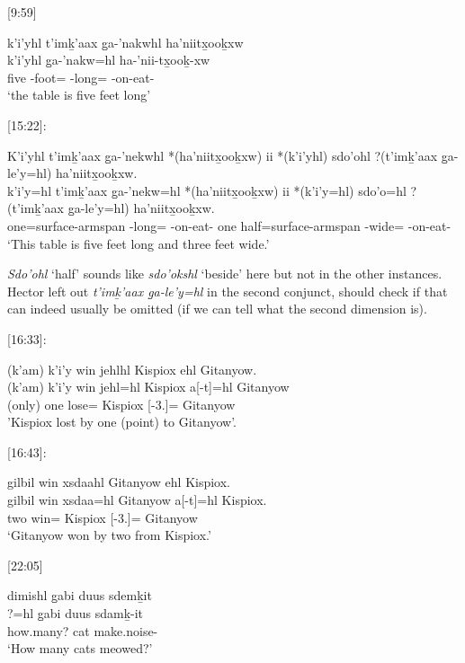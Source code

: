 [9:59] \begin{exe}
    \ex \glll
    k'i'yhl t’imḵ’aax g̱a-’nakwhl ha’niitx̱ooḵxw \\
    k'i'yhl g̱a-’nakw=hl ha-’nii-tx̱ooḵ-xw \\
    five \Pl-foot=\Cn{} \Dist-long=\Cn{} \Ins-on-eat-\Val{} \\
    \glt `the table is five feet long'
\end{exe}

[15:22]:
\begin{exe}
    \ex \glll
    K’i’yhl t’imḵ’aax g̱a-’nekwhl *(ha’niitx̱ooḵxw) ii *(k’i’yhl) sdo’ohl ?(t’imḵ’aax g̱a-le’y=hl) ha’niitx̱ooḵxw. \\
    k’i’y=hl t’imḵ’aax g̱a-’nekw=hl *(ha’niitx̱ooḵxw) ii *(k’i’y=hl) sdo’o=hl ?(t’imḵ’aax g̱a-le’y=hl) ha’niitx̱ooḵxw. \\
    one=\Cn{}surface-armspan \Dist-long=\Cn{} \Ins-on-eat-\Val{} one half=\Cn{}surface-armspan \Dist-wide=\Cn{} \Ins-on-eat-\Val{} \\
    \glt `This table is five feet long and three feet wide.'
\end{exe}

\textit{Sdo’ohl} `half'  sounds like \textit{sdo’okshl} `beside' here but not in the other instances. Hector left out \textit{t’imḵ’aax g̱a-le’y=hl} in the second conjunct, should check if that can indeed usually be omitted (if we can tell what the second dimension is). 

[16:33]:
\begin{exe}
    \ex \glll 
    (k’am) k'i'y win jehlhl Kispiox ehl Gitanyow. \\	
    (k’am) k'i'y win jehl=hl Kispiox a[-t]=hl Gitanyow \\
    (only) one \Comp{} lose=\Cn{} Kispiox \Prep{}[-3.\Ii]=\Cn{} Gitanyow \\
    \glt 'Kispiox lost by one (point) to Gitanyow'.
\end{exe}


[16:43]:
\begin{exe}
    \ex \glll 
    gilbil win xsdaahl Gitanyow ehl Kispiox. \\
    gilbil win xsdaa=hl Gitanyow a[-t]=hl Kispiox. \\
    two \Comp win=\Cn{} Kispiox \Prep{}[-3.\Ii]=\Cn{} Gitanyow \\
    \glt `Gitanyow won by two from Kispiox.'
\end{exe}

[22:05]
\begin{exe}
    \ex \glll 
    dimishl g̱abi duus sdemḵit \\
    ?=hl g̱abi duus sdamḵ-it \\
    how.many? \Cnt{} cat make.noise-\Sx \\
    `How many cats meowed?' 
\end{exe}

